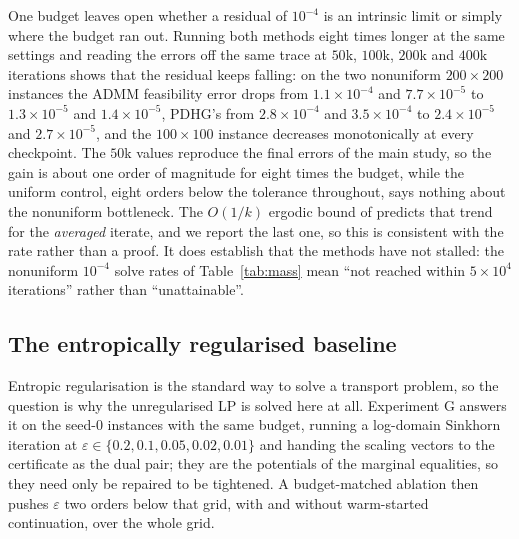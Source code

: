 \documentclass{article}
\newcommand{\Tol}[1]{10^{-#1}}
\begin{document}
One budget leaves open whether a residual of $\Tol{4}$ is an intrinsic limit or simply
where the budget ran out. Running both methods eight times longer at the same settings and
reading the errors off the same trace at $50$k, $100$k, $200$k and $400$k iterations shows
that the residual keeps falling: on the two nonuniform $200\times200$ instances the ADMM
feasibility error drops from $1.1\times\Tol{4}$ and $7.7\times\Tol{5}$ to
$1.3\times\Tol{5}$ and $1.4\times\Tol{5}$, PDHG's from $2.8\times\Tol{4}$ and
$3.5\times\Tol{4}$ to $2.4\times\Tol{5}$ and $2.7\times\Tol{5}$, and the $100\times100$ instance decreases
monotonically at every checkpoint. The $50$k values reproduce the final errors of the main
study, so the gain is about one order of magnitude for eight times the budget, while the
uniform control, eight orders below the tolerance throughout, says nothing about the
nonuniform bottleneck. The $O(1/k)$ ergodic bound of \citet{he2012rate} predicts that trend
for the \emph{averaged} iterate, and we report the last one, so this is consistent with the
rate rather than a proof. It does establish that the methods have not stalled: the nonuniform
$\Tol{4}$ solve rates of Table~\ref{tab:mass} mean ``not reached within $5\times10^4$
iterations'' rather than ``unattainable''.

\subsection{The entropically regularised baseline}
\label{sec:sinkhorn}

Entropic regularisation is the standard way to solve a transport problem, so the question
is why the unregularised LP is solved here at all. Experiment G answers it on the seed-$0$
instances with the same budget, running a log-domain Sinkhorn iteration at
$\varepsilon\in\{0.2,0.1,0.05,0.02,0.01\}$ and handing the scaling vectors to the
certificate as the dual pair; they are the potentials of the marginal equalities, so they
need only be repaired to be tightened. A budget-matched ablation then pushes $\varepsilon$
two orders below that grid, with and without warm-started continuation, over the whole
grid.
\end{document}
